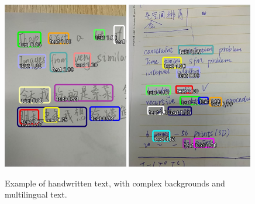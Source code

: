 \begin{figure}[h!]
\includegraphics[width=0.49\textwidth]{Mobile/images/app17.jpg}
\includegraphics[width=0.49\textwidth]{Mobile/images/app18.jpg}


\caption{Example of handwritten text, with complex backgrounds and multilingual text.}
\label{fig:handwritten}
\end{figure}




